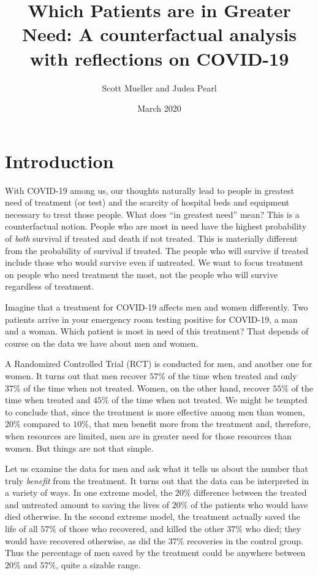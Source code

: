 \documentclass{article}
\title{Which Patients are in Greater Need: A counterfactual analysis with reflections on COVID-19}
\author{Scott Mueller and Judea Pearl}
\date{March 2020}
\begin{document}
\maketitle

\section{Introduction}
With COVID-19 among us, our thoughts naturally lead to people in greatest need of treatment (or test) and the scarcity of hospital beds and equipment necessary to treat those people. What does ``in greatest need'' mean? This is a counterfactual notion. People who are most in need have the highest probability of \emph{both} survival if treated and death if not treated. This is materially different from the probability of survival if treated. The people who will survive if treated include those who would survive even if untreated. We want to focus treatment on people who need treatment the most, not the people who will survive regardless of treatment.

Imagine that a treatment for COVID-19 affects men and women differently. Two patients arrive in your emergency room testing positive for COVID-19, a man and a woman. Which patient is most in need of this treatment? That depends of course on the data we have about men and women.

A Randomized Controlled Trial (RCT) is conducted for men, and another one for women. It turns out that men recover $57\%$ of the time when treated and only $37\%$ of the time when not treated. Women, on the other hand, recover $55\%$ of the time when treated and $45\%$ of the time when not treated. We might be tempted to conclude that, since the treatment is more effective among men than women, $20\%$ compared to $10\%$, that men benefit more from the treatment and, therefore, when resources are limited, men are in greater need for those resources than women. But things are not that simple.

Let us examine the data for men and ask what it tells us about the number that truly \emph{benefit} from the treatment. It turns out that the data can be interpreted in a variety of ways. In one extreme model, the $20\%$ difference between the treated and untreated amount to saving the lives of $20\%$ of the patients who would have died otherwise. In the second extreme model, the treatment actually saved the life of all $57\%$ of those who recovered, and killed the other $37\%$ who died; they would have recovered otherwise, as did the $37\%$ recoveries in the control group. Thus the percentage of men saved by the treatment could be anywhere between $20\%$ and $57\%$, quite a sizable range.
\end{document}

